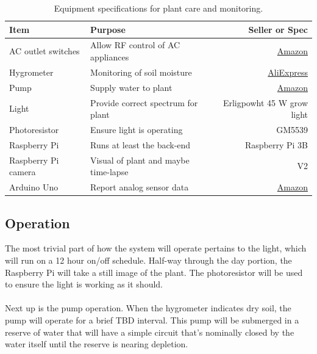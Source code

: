 \documentclass[]{article}
\begin{document}
\begin{table}[h]
\centering
\caption{Equipment specifications for plant care and monitoring.}
\begin{tabular}{l|l|r }
\textbf{Item} & \textbf{Purpose} & \textbf{Seller or Spec} \\ \hline
AC outlet switches & Allow RF control of AC appliances & \href{https://www.amazon.com/gp/product/B00DQELHBS/ref=ppx_yo_dt_b_search_asin_title?ie=UTF8\&psc=1}{Amazon} \\ \hline
Hygrometer & Monitoring of soil moisture & \href{https://www.aliexpress.com/item/32700826684.html?spm=a2g0s.9042311.0.0.770c4c4dQ7v1Z2}{AliExpress} \\ \hline 
Pump & Supply water to plant & \href{https://www.amazon.com/gp/product/B00EWENMAU/ref=ppx_yo_dt_b_search_asin_title?ie=UTF8&psc=1}{Amazon} \\ \hline 
Light & Provide correct spectrum for plant & Erligpowht 45 W grow light \\ \hline
Photoresistor & Ensure light is operating & GM5539 \\ \hline
Raspberry Pi & Runs at least the back-end & Raspberry Pi 3B \\ \hline
Raspberry Pi camera & Visual of plant and maybe time-lapse & V2 \\ \hline
Arduino Uno & Report analog sensor data & \href{https://www.amazon.com/gp/product/B015QUPO5Y/ref=ppx_yo_dt_b_search_asin_title?ie=UTF8&psc=1}{Amazon} 
\end{tabular}
\end{table}

\subsection{Operation}
The most trivial part of how the system will operate pertains to the light, which will run on a 12 hour on/off schedule.  Half-way through the day portion, the Raspberry Pi will take a still image of the plant.  The photoresistor will be used to ensure the light is working as it should.
\\\\
Next up is the pump operation.  When the hygrometer indicates dry soil, the pump will operate for a brief TBD interval.  This pump will be submerged in a reserve of water that will have a simple circuit that's nominally closed by the water itself until the reserve is nearing depletion.
\end{document}
